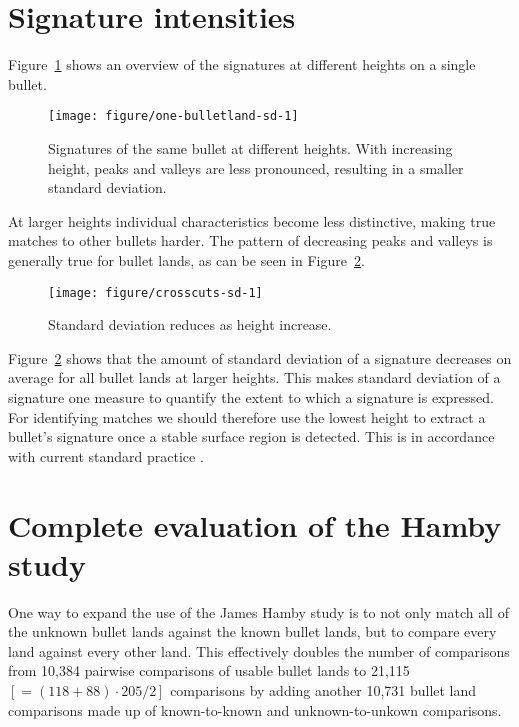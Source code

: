 \documentclass[aoas]{imsart}\usepackage[]{graphicx}\usepackage[]{color}
\makeatletter
\newenvironment{kframe}{%
 \def\at@end@of@kframe{}%
 \ifinner\ifhmode%
  \def\at@end@of@kframe{\end{minipage}}%
  \begin{minipage}{\columnwidth}%
 \fi\fi%
 \def\FrameCommand##1{\hskip\@totalleftmargin \hskip-\fboxsep
 \colorbox{shadecolor}{##1}\hskip-\fboxsep
     \hskip-\linewidth \hskip-\@totalleftmargin \hskip\columnwidth}%
 \MakeFramed {\advance\hsize-\width
   \@totalleftmargin\z@ \linewidth\hsize
   \@setminipage}}%
 {\par\unskip\endMakeFramed%
 \at@end@of@kframe}
\newenvironment{knitrout}{}{} %
\makeatother
\begin{document}
\newpage
\section{Signature intensities}\label{supp:bulletbottom}

%
Figure~\ref{fig:overview} shows an overview of the signatures at different heights on a single bullet. 
\begin{figure}[hbtp]
\begin{knitrout}
\color{fgcolor}
\texttt{[image: figure/one-bulletland-sd-1]} 

\end{knitrout}
\caption{\label{fig:overview}Signatures of the same bullet at different heights.  With increasing height, peaks and valleys are less pronounced, resulting in a smaller standard deviation.}
\end{figure}
At larger heights  individual characteristics become less distinctive, making true matches to other bullets harder. The pattern of decreasing peaks and valleys is generally true for  bullet lands, as can be seen in Figure~\ref{fig:sds}. 
%
\begin{figure}[hbtp]
\centering
\begin{knitrout}
\color{fgcolor}\begin{kframe}


{\ttfamily\noindent\itshape\color{messagecolor}{\#\# `geom\_smooth()` using method = 'gam'}}\end{kframe}
\texttt{[image: figure/crosscuts-sd-1]} 

\end{knitrout}
\caption{\label{fig:sds}Standard deviation reduces as height increase.}
\end{figure}
Figure~\ref{fig:sds} shows that the amount of standard deviation of a signature decreases on average for all bullet lands at larger heights.
This makes standard deviation of a signature one measure to quantify the extent to which a signature is expressed. For identifying matches we should therefore use the lowest height to extract a bullet's signature once a stable surface region is detected. This is in accordance with current standard practice \citep{afte:1992}.

\section{Complete evaluation of the Hamby study}\label{supp:extended}
One way to expand the use of the James Hamby study is to not only match all of the unknown bullet lands against the known bullet lands, but to compare every land against every other land. This effectively doubles the number of comparisons from 10,384 pairwise comparisons of usable bullet lands to 21,115 $\left[= (118+88)\cdot 205/2\right]$ comparisons by adding another 10,731 bullet land comparisons made up of known-to-known and unknown-to-unkown comparisons. 
\end{document}
